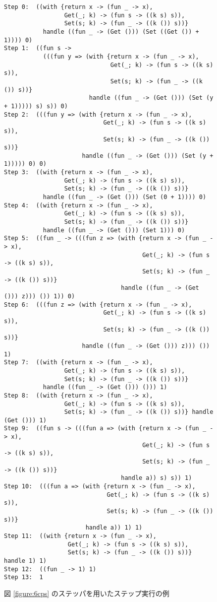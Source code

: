 \begin{figure}
\begin{spacing}{0.8}
\begin{verbatim}
Step 0:  ((with {return x -> (fun _ -> x),
                 Get(_; k) -> (fun s -> ((k s) s)),
                 Set(s; k) -> (fun _ -> ((k ()) s))}
           handle ((fun _ -> (Get ())) (Set ((Get ()) + 1)))) 0)
Step 1:  ((fun s ->
           (((fun y => (with {return x -> (fun _ -> x),
                              Get(_; k) -> (fun s -> ((k s) s)),
                              Set(s; k) -> (fun _ -> ((k ()) s))}
                        handle ((fun _ -> (Get ())) (Set (y + 1))))) s) s)) 0)
Step 2:  (((fun y => (with {return x -> (fun _ -> x),
                            Get(_; k) -> (fun s -> ((k s) s)),
                            Set(s; k) -> (fun _ -> ((k ()) s))}
                      handle ((fun _ -> (Get ())) (Set (y + 1))))) 0) 0)
Step 3:  ((with {return x -> (fun _ -> x),
                 Get(_; k) -> (fun s -> ((k s) s)),
                 Set(s; k) -> (fun _ -> ((k ()) s))}
           handle ((fun _ -> (Get ())) (Set (0 + 1)))) 0)
Step 4:  ((with {return x -> (fun _ -> x),
                 Get(_; k) -> (fun s -> ((k s) s)),
                 Set(s; k) -> (fun _ -> ((k ()) s))}
           handle ((fun _ -> (Get ())) (Set 1))) 0)
Step 5:  ((fun _ -> (((fun z => (with {return x -> (fun _ -> x),
                                       Get(_; k) -> (fun s -> ((k s) s)),
                                       Set(s; k) -> (fun _ -> ((k ()) s))}
                                 handle ((fun _ -> (Get ())) z))) ()) 1)) 0)
Step 6:  (((fun z => (with {return x -> (fun _ -> x),
                            Get(_; k) -> (fun s -> ((k s) s)),
                            Set(s; k) -> (fun _ -> ((k ()) s))}
                      handle ((fun _ -> (Get ())) z))) ()) 1)
Step 7:  ((with {return x -> (fun _ -> x),
                 Get(_; k) -> (fun s -> ((k s) s)),
                 Set(s; k) -> (fun _ -> ((k ()) s))}
           handle ((fun _ -> (Get ())) ())) 1)
Step 8:  ((with {return x -> (fun _ -> x),
                 Get(_; k) -> (fun s -> ((k s) s)),
                 Set(s; k) -> (fun _ -> ((k ()) s))} handle (Get ())) 1)
Step 9:  ((fun s -> (((fun a => (with {return x -> (fun _ -> x),
                                       Get(_; k) -> (fun s -> ((k s) s)),
                                       Set(s; k) -> (fun _ -> ((k ()) s))}
                                 handle a)) s) s)) 1)
Step 10:  (((fun a => (with {return x -> (fun _ -> x),
                             Get(_; k) -> (fun s -> ((k s) s)),
                             Set(s; k) -> (fun _ -> ((k ()) s))}
                       handle a)) 1) 1)
Step 11:  ((with {return x -> (fun _ -> x),
                  Get(_; k) -> (fun s -> ((k s) s)),
                  Set(s; k) -> (fun _ -> ((k ()) s))} handle 1) 1)
Step 12:  ((fun _ -> 1) 1)
Step 13:  1
\end{verbatim}
\end{spacing}
\caption{図 \ref{figure:6cps} のステッパを用いたステップ実行の例}
\label{figure:step_example}
\end{figure}


